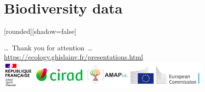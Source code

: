 \documentclass[10pt,table,dvipsnames,compress]{beamer}
\begin{document}
\section{Biodiversity data}
\label{sec:orgef5f1e1}


{
  [rounded][shadow=false]
  \begin{frame}[plain]
    \begin{block}{}
      \begin{center}
        \ldots~Thank you for attention~\ldots \\
        \url{https://ecology.ghislainv.fr/presentations.html} \\
        \includegraphics[width=0.8\textwidth]{figs/partners_logos}
      \end{center}
    \end{block}
  \end{frame}
}
\end{document}
